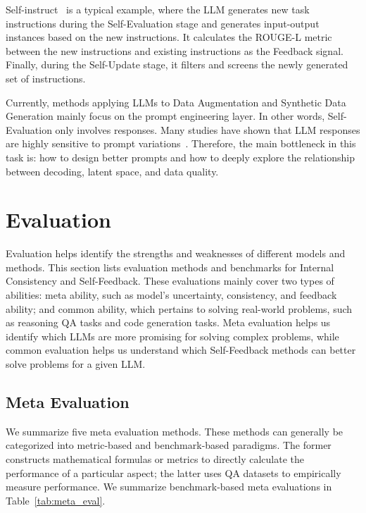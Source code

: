 \documentclass[lettersize,journal]{IEEEtran}
\begin{document}
Self-instruct~\cite{SelfInstruct_23_ACL_Washington} is a typical example, where the LLM generates new task instructions during the Self-Evaluation stage and generates input-output instances based on the new instructions. It calculates the ROUGE-L metric between the new instructions and existing instructions as the Feedback signal. Finally, during the Self-Update stage, it filters and screens the newly generated set of instructions.

Currently, methods applying LLMs to Data Augmentation and Synthetic Data Generation mainly focus on the prompt engineering layer. In other words, Self-Evaluation only involves responses. Many studies have shown that LLM responses are highly sensitive to prompt variations~\cite{PromptSensitive_23_arXiv_UoW,yu2024xfinder}. Therefore, the main bottleneck in this task is: how to design better prompts and how to deeply explore the relationship between decoding, latent space, and data quality.




\section{Evaluation} \label{sec:evaluation}


\noindent Evaluation helps identify the strengths and weaknesses of different models and methods. This section lists evaluation methods and benchmarks for Internal Consistency and Self-Feedback. These evaluations mainly cover two types of abilities: meta ability, such as model's uncertainty, consistency, and feedback ability; and common ability, which pertains to solving real-world problems, such as reasoning QA tasks and code generation tasks. Meta evaluation helps us identify which LLMs are more promising for solving complex problems, while common evaluation helps us understand which Self-Feedback methods can better solve problems for a given LLM.


\subsection{Meta Evaluation}


\noindent We summarize five meta evaluation methods. These methods can generally be categorized into metric-based and benchmark-based paradigms. The former constructs mathematical formulas or metrics to directly calculate the performance of a particular aspect; the latter uses QA datasets to empirically measure performance. We summarize benchmark-based meta evaluations in Table~\ref{tab:meta_eval}.
\end{document}
